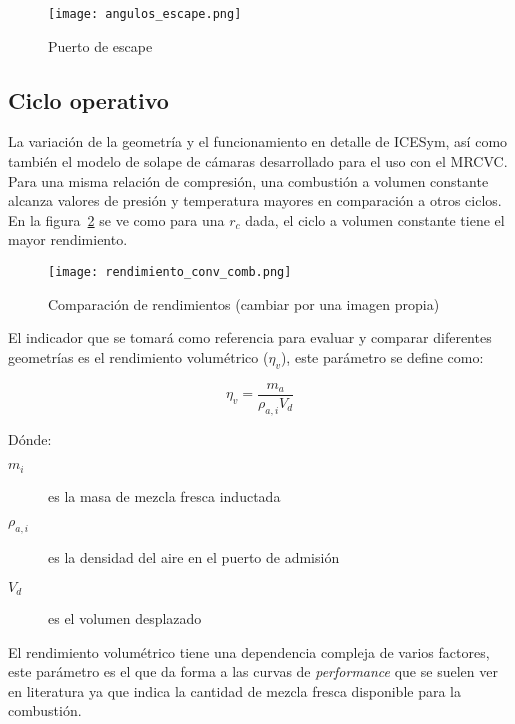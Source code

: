 \begin{figure}
    \centering
    \texttt{[image: angulos\_escape.png]}
    \caption{Puerto de escape}\label{fig:angulos_escape}
\end{figure}



\subsection{Ciclo operativo}
%
La variación de la geometría y el funcionamiento en detalle de ICESym, así como
también el modelo de solape de cámaras desarrollado para el uso con el MRCVC.\@
%
Para una misma relación de compresión, una combustión a volumen constante
alcanza valores de presión y temperatura mayores en comparación a otros ciclos.
%
En la figura~\ref{fig:comparacion_rendimientos} se ve como para una $r_c$ dada,
el ciclo a volumen constante tiene el mayor rendimiento.

\begin{figure}
    \centering
    \texttt{[image: rendimiento\_conv\_comb.png]}
    \caption{Comparación de rendimientos (cambiar por una imagen propia)}\label{fig:comparacion_rendimientos}
\end{figure}

El indicador que se tomará como referencia para evaluar y comparar diferentes
geometrías es el rendimiento volumétrico ($\eta_v$), este parámetro se define
como:

\begin{equation}
    \eta_v = \frac{m_a}{\rho_{a,i}V_d}
\end{equation}

Dónde:
%
\begin{description}
    \item[$m_i$] es la masa de mezcla fresca inductada
    \item[$\rho_{a,i}$] es la densidad del aire en el puerto de admisión
    \item[$V_d$] es el volumen desplazado
\end{description}

El rendimiento volumétrico tiene una dependencia compleja de varios factores,
este parámetro es el que da forma a las curvas de \emph{performance} que se
suelen ver en literatura ya que indica la cantidad de mezcla fresca disponible
para la combustión. 
%

